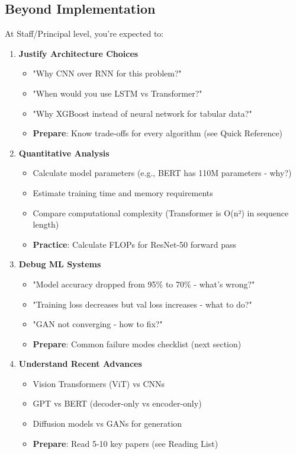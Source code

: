 \documentclass[10pt]{article}
\begin{document}
\subsection{Beyond Implementation}

At Staff/Principal level, you're expected to:

\begin{enumerate}
\item \textbf{Justify Architecture Choices}
\begin{itemize}
\item "Why CNN over RNN for this problem?"
\item "When would you use LSTM vs Transformer?"
\item "Why XGBoost instead of neural network for tabular data?"
\item \textbf{Prepare}: Know trade-offs for every algorithm (see Quick Reference)
\end{itemize}

\item \textbf{Quantitative Analysis}
\begin{itemize}
\item Calculate model parameters (e.g., BERT has 110M parameters - why?)
\item Estimate training time and memory requirements
\item Compare computational complexity (Transformer is O(n²) in sequence length)
\item \textbf{Practice}: Calculate FLOPs for ResNet-50 forward pass
\end{itemize}

\item \textbf{Debug ML Systems}
\begin{itemize}
\item "Model accuracy dropped from 95\% to 70\% - what's wrong?"
\item "Training loss decreases but val loss increases - what to do?"
\item "GAN not converging - how to fix?"
\item \textbf{Prepare}: Common failure modes checklist (next section)
\end{itemize}

\item \textbf{Understand Recent Advances}
\begin{itemize}
\item Vision Transformers (ViT) vs CNNs
\item GPT vs BERT (decoder-only vs encoder-only)
\item Diffusion models vs GANs for generation
\item \textbf{Prepare}: Read 5-10 key papers (see Reading List)
\end{itemize}
\end{enumerate}
\end{document}
